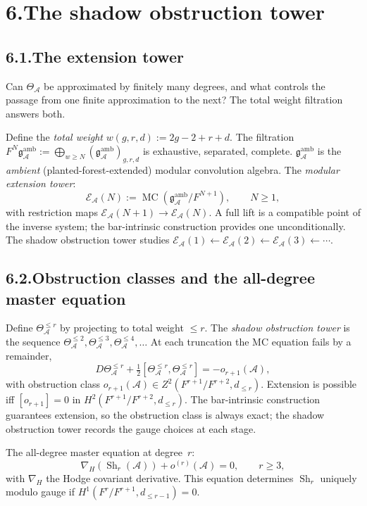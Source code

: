 \documentclass[11pt,reqno]{amsart}
\theoremstyle{definition}
\theoremstyle{remark}
\providecommand{\cA}{\mathcal{A}}
\providecommand{\cE}{\mathcal{E}}
\numberwithin{equation}{section}
\begin{document}
\section*{6.\quad The shadow obstruction tower}

\subsection*{6.1.\enspace The extension tower}

Can $\Theta_\cA$ be approximated by finitely many degrees, and what
controls the passage from one finite approximation to the next? The
total weight filtration answers both.

Define the \emph{total weight} $w(g,r,d):=2g-2+r+d$. The filtration
$F^N\mathfrak g^{\mathrm{amb}}_\cA:=\bigoplus_{w\ge N}(\mathfrak g^{\mathrm{amb}}_\cA)_{g,r,d}$
is exhaustive, separated, complete. $\mathfrak g^{\mathrm{amb}}_\cA$
is the \emph{ambient} (planted-forest-extended) modular convolution
algebra. The \emph{modular extension tower}:
\[
\cE_\cA(N):=\operatorname{MC}(\mathfrak g^{\mathrm{amb}}_\cA/F^{N+1}),\qquad N\ge 1,
\]
with restriction maps $\cE_\cA(N+1)\to\cE_\cA(N)$. A full lift is a
compatible point of the inverse system; the bar-intrinsic construction
provides one unconditionally. The shadow obstruction tower studies
$\cE_\cA(1)\leftarrow\cE_\cA(2)\leftarrow\cE_\cA(3)\leftarrow\cdots$.

\subsection*{6.2.\enspace Obstruction classes and the all-degree master equation}

Define $\Theta_\cA^{\le r}$ by projecting to total weight $\le r$. The
\emph{shadow obstruction tower} is the sequence
$\Theta_\cA^{\le 2},\Theta_\cA^{\le 3},\Theta_\cA^{\le 4},\ldots$ At
each truncation the MC equation fails by a remainder,
\[
D\Theta^{\le r}_\cA+\tfrac12[\Theta^{\le r}_\cA,\Theta^{\le r}_\cA]=-o_{r+1}(\cA),
\]
with obstruction class $o_{r+1}(\cA)\in Z^2(F^{r+1}/F^{r+2},d_{\le r})$.
Extension is possible iff $[o_{r+1}]=0$ in
$H^2(F^{r+1}/F^{r+2},d_{\le r})$. The bar-intrinsic construction
guarantees extension, so the obstruction class is always exact; the
shadow obstruction tower records the gauge choices at each stage.

The all-degree master equation at degree~$r$:
\[
\nabla_H(\operatorname{Sh}_r(\cA))+o^{(r)}(\cA)=0,\qquad r\ge 3,
\]
with $\nabla_H$ the Hodge covariant derivative. This equation
determines $\operatorname{Sh}_r$ uniquely modulo gauge if
$H^1(F^r/F^{r+1},d_{\le r-1})=0$.
\end{document}
